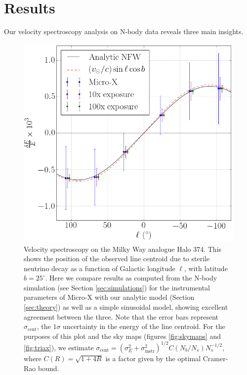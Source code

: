 \documentclass[aps,prd,10pt,twocolumn,superscriptaddress,showpacs,footinbib]{revtex4-1}
\begin{document}
\section{Results}
\label{sec:results}

Our velocity spectroscopy analysis on N-body data reveals three main insights.

\begin{figure}[h!]
\centering
\includegraphics[width=1.0\columnwidth]{de_vs_l.png}
\caption{Velocity spectroscopy on the Milky Way analogue Halo 374. This shows the position of the observed line centroid due to sterile
	neutrino decay as a function of Galactic longitude $\ell$, with latitude $b=25^\circ$.
	Here we compare results as computed from the N-body simulation (see Section \ref{sec:simulations}) for the
	instrumental parameters of Micro-X with our analytic model (Section
	\ref{sec:theory}) as well as a simple sinusoidal model, showing excellent agreement between the
	three. Note that the error bars represent $\sigma_{\mathrm{cent}}$, the $1\sigma$ uncertainty
	in the energy of the line centroid. For the
	purposes of this plot and the sky maps (figures \ref{fig:skymaps} and \ref{fig:triax}), we estimate
	$\sigma_\mathrm{cent} = (\sigma_E^2+\sigma_\mathrm{instr}^2)^{1/2}C(N_b/N_s)N_s^{-1/2}$, where
	$C(R)=\sqrt{1+4R}$ is a factor given by the optimal Cramer-Rao bound.}
\label{fig:de_vs_l}
\end{figure}
\end{document}
